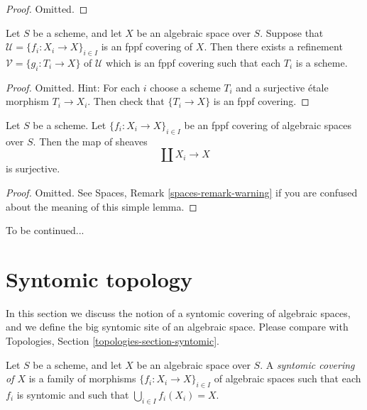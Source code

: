 \begin{proof}
Omitted.
\end{proof}

\begin{lemma}
\label{lemma-refine-fppf-schemes}
Let $S$ be a scheme, and let $X$ be an algebraic space over $S$.
Suppose that $\mathcal{U} = \{f_i : X_i \to X\}_{i \in I}$ is an
fppf covering of $X$. Then there exists a refinement
$\mathcal{V} = \{g_i : T_i \to X\}$ of $\mathcal{U}$ which is an
fppf covering such that each $T_i$ is a scheme.
\end{lemma}

\begin{proof}
Omitted. Hint: For each $i$ choose a scheme $T_i$ and a surjective \'etale
morphism $T_i \to X_i$. Then check that $\{T_i \to X\}$ is an fppf covering.
\end{proof}

\begin{lemma}
\label{lemma-fppf-covering-surjective}
Let $S$ be a scheme.
Let $\{f_i : X_i \to X\}_{i \in I}$ be an fppf covering of algebraic
spaces over $S$. Then the map of sheaves
$$
\coprod X_i \longrightarrow X
$$
is surjective.
\end{lemma}

\begin{proof}
Omitted. See
Spaces, Remark \ref{spaces-remark-warning}
if you are confused about the meaning of this simple lemma.
\end{proof}

\noindent
To be continued...




\section{Syntomic topology}
\label{section-syntomic}

\noindent
In this section we discuss the notion of a syntomic covering of
algebraic spaces, and we define the big syntomic site of an
algebraic space. Please compare with
Topologies, Section \ref{topologies-section-syntomic}.

\begin{definition}
\label{definition-syntomic-covering}
Let $S$ be a scheme, and let $X$ be an algebraic space over $S$.
A {\it syntomic covering of $X$} is a family of morphisms
$\{f_i : X_i \to X\}_{i \in I}$ of algebraic spaces
such that each $f_i$ is syntomic
and such that $\bigcup_{i \in I} f_i(X_i) = X$.
\end{definition}

